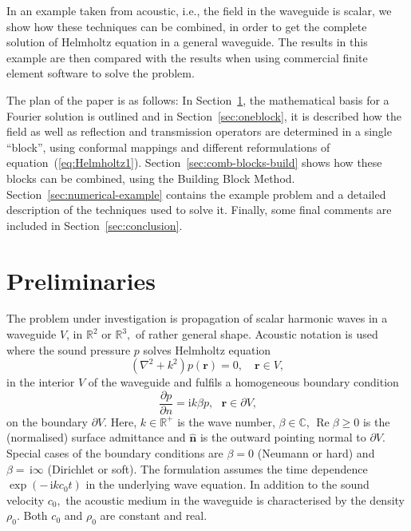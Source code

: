 \documentclass[numreferences]{kluwer}
\renewcommand{\Re}{\operatorname{Re}}
\renewcommand{\i}{\,\mathrm{i}}
\begin{document}
In an example taken from acoustic, i.e., the field in the waveguide
is scalar, we show how these techniques can be combined, in order to
get the complete solution of Helmholtz equation in a general
waveguide. The results in this example are then compared with the
results when using commercial finite element software to solve the
problem.

The plan of the paper is as follows: In Section~\ref{sec:prel}, the
mathematical basis for a Fourier solution is outlined and in
Section~\ref{sec:oneblock}, it is described how the field as well as
reflection and transmission operators are determined in a single
``block'', using conformal mappings and different reformulations of
equation~(\ref{eq:Helmholtz1}).  Section~\ref{sec:comb-blocks-build}
shows how these blocks can be combined, using the Building Block
Method. Section~\ref{sec:numerical-example} contains the example
problem and a detailed description of the techniques used to solve
it. Finally, some final comments are included in
Section~\ref{sec:conclusion}.

\section{Preliminaries}
\label{sec:prel}

The problem under investigation is propagation of scalar harmonic
waves in a waveguide $V$, in $\mathbb{R}^{2}$ or $\mathbb{R}^{3},$ of
rather general shape. Acoustic notation is used where the sound
pressure $p$ solves Helmholtz equation%
\begin{equation}
  (\nabla^{2}+k^{2})p(\bm{r})=0,\quad\bm{r}\in V, \label{101}%
\end{equation}
in the interior $V$ of the waveguide and fulfils a homogeneous
boundary condition%
\begin{equation}
  \dfrac{\partial p}{\partial n}=\text{i}k\beta p,
  \text{ }\bm{r}\in\partial V\text{,} \label{102}%
\end{equation}
on the boundary $\partial V$. Here, $k\in\mathbb{R}^{+}$ is the
wave number, $\beta\in\mathbb{C}$, $\Re\beta\geq0$ is the (normalised)
surface admittance and $\widehat{\bm{n}}$ is the outward pointing
normal to $\partial V$. Special cases of the boundary conditions are
$\beta=0$ (Neumann or hard) and $\beta=\i\infty$ (Dirichlet or
soft). The formulation assumes the time dependence $\exp(-\i kc_{0}t)$
in the underlying wave equation. In addition to the sound velocity
$c_{0},$ the acoustic medium in the waveguide is characterised by the
density $\rho_{0}.$ Both $c_{0}$ and $\rho_{0}$ are constant and real.
\end{document}
